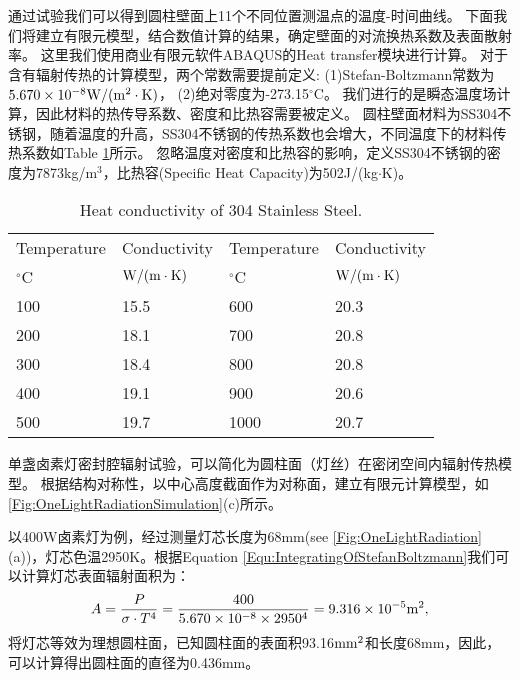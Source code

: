 通过试验我们可以得到圆柱壁面上11个不同位置测温点的温度-时间曲线。
下面我们将建立有限元模型，结合数值计算的结果，确定壁面的对流换热系数及表面散射率。
这里我们使用商业有限元软件ABAQUS的Heat transfer模块进行计算。
对于含有辐射传热的计算模型，两个常数需要提前定义:
(1)Stefan-Boltzmann常数为$5.670\times10^{-8}\rm{W}/(\rm{m}^{2}\cdot \rm{K})$，
(2)绝对零度为-273.15$^{\circ}$C。
我们进行的是瞬态温度场计算，因此材料的热传导系数、密度和比热容需要被定义。
圆柱壁面材料为SS304不锈钢，随着温度的升高，SS304不锈钢的传热系数也会增大，不同温度下的材料传热系数如Table \ref{Tab:SS304HeatTransfer}所示。
忽略温度对密度和比热容的影响，定义SS304不锈钢的密度为7873kg/m$^3$，比热容(Specific Heat Capacity)为502J/(kg$\cdot$K)。

\begin{table}[htbp]
  \centering
  \caption{Heat conductivity of 304 Stainless Steel.}
    \begin{tabular}{llll}
    \toprule
    Temperature & Conductivity & Temperature & Conductivity \\
    $^{\circ}$C & ${\rm{W/(m}} \cdot {\rm{K)}}$ & $^{\circ}$C & ${\rm{W/(m}} \cdot {\rm{K)}}$ \\
    \midrule
    100   & 15.5  & 600   & 20.3 \\
    200   & 18.1  & 700   & 20.8 \\
    300   & 18.4  & 800   & 20.8 \\
    400   & 19.1  & 900   & 20.6 \\
    500   & 19.7  & 1000  & 20.7 \\
    \bottomrule
    \end{tabular}%
  \label{Tab:SS304HeatTransfer}%
\end{table}%


单盏卤素灯密封腔辐射试验，可以简化为圆柱面（灯丝）在密闭空间内辐射传热模型。
根据结构对称性，以中心高度截面作为对称面，建立有限元计算模型，如\ref{Fig:OneLightRadiationSimulation}(c)所示。

以400W卤素灯为例，经过测量灯芯长度为68mm(see \ref{Fig:OneLightRadiation}(a))，灯芯色温2950K。根据Equation \ref{Equ:IntegratingOfStefanBoltzmann}我们可以计算灯芯表面辐射面积为：
\begin{equation}
A = \frac{P}{\sigma \cdot T^4} = \frac{400}{5.670\times10^{-8}\times2950^4}=9.316\times10^{-5} {\rm{m}}^2,
\end{equation}
将灯芯等效为理想圆柱面，已知圆柱面的表面积93.16${\rm{mm}}^2$和长度68mm，因此，可以计算得出圆柱面的直径为0.436mm。

